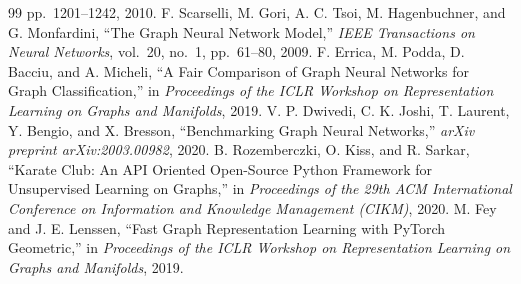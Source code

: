 \begin{thebibliography}{99}
pp.~1201--1242, 2010.
F. Scarselli, M. Gori, A. C. Tsoi, M. Hagenbuchner,
and G. Monfardini,
``The Graph Neural Network Model,''
\emph{IEEE Transactions on Neural Networks}, vol.~20, no.~1,
pp.~61--80, 2009.
F. Errica, M. Podda, D. Bacciu, and A. Micheli,
``A Fair Comparison of Graph Neural Networks for Graph Classification,''
in \emph{Proceedings of the ICLR Workshop on Representation Learning on Graphs and Manifolds},
2019.
V. P. Dwivedi, C. K. Joshi, T. Laurent, Y. Bengio,
and X. Bresson,
``Benchmarking Graph Neural Networks,''
\emph{arXiv preprint arXiv:2003.00982}, 2020.
B. Rozemberczki, O. Kiss, and R. Sarkar,
``Karate Club: An API Oriented Open-Source Python Framework for Unsupervised Learning on Graphs,''
in \emph{Proceedings of the 29th ACM International Conference on Information and Knowledge Management (CIKM)},
2020.
M. Fey and J. E. Lenssen,
``Fast Graph Representation Learning with PyTorch Geometric,''
in \emph{Proceedings of the ICLR Workshop on Representation Learning on Graphs and Manifolds},
2019.



\end{thebibliography}